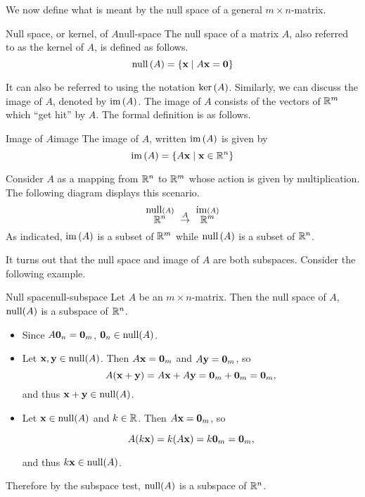 We now define what is meant by the null space of a general $m\times n$-matrix.

\begin{definition}{Null space, or kernel, of $A$}{null-space}
The null space of a matrix $A$, also referred to as the kernel of $A$, 
is defined as follows.%
\begin{equation*}
\mbox{\rm null} \left(A\right) =\left\{\mbox{\bf x} \mid A \mbox{\bf x} =\mbox{\bf 0}\right\}
\end{equation*}
\end{definition}

It can also be referred to using the notation $\ker \left(
A\right)$. 
Similarly, we can discuss the image of $A$, denoted by
$\mbox{\rm im}\left(A\right)$. The image of $A$ consists of the vectors
of $\mathbb{R}^{m}$ which ``get hit'' by $A$.  The formal definition
is as follows.

\begin{definition}{Image of $A$}{image}
The image of $A$, written $\mbox{\rm im}\left(A\right)$ is given by
\[
\mbox{\rm im}\left(A \right) = \left\{A\mbox{\bf x} \mid \mbox{\bf x} \in \mathbb{R}^n \right\}
\]
\end{definition}

Consider
$A$ as a mapping from $\mathbb{R}^{n}$ to $\mathbb{R}^{m}$ whose action is given by multiplication. The following diagram displays this scenario. 
\begin{equation*}
\overset{\func{null} \tup{A} }{\R^{n}}\ \overset{A}{\rightarrow }\ 
\overset{
\func{im}\tup{A} }{\R^{m}}
\end{equation*}
As indicated, $\mbox{\rm im}\left(A\right) $ is a subset of $\mathbb{R}^{m}$
while $\mbox{\rm null} \left(A\right) $ is a subset of $\mathbb{R}^{n}$.

It turns out that the null space and image of $A$ are both subspaces. Consider the following example.

\begin{example}{Null space}{null-subspace}
Let $A$ be an $m\times n$-matrix. Then the null space of $A$, $\mbox{\rm null}(A)$ is 
a subspace of $\mathbb{R}^n$.
\end{example}

\begin{solution}
\begin{itemize}
\item Since $A\mbox{\bf 0}_n=\mbox{\bf 0}_m$, 
$\mbox{\bf 0}_n\in\mbox{\rm null}(A)$.

\item Let $\mbox{\bf x},\mbox{\bf y}\in\mbox{\rm null}(A)$. 
Then $A\mbox{\bf x}=\mbox{\bf 0}_m$ and $A\mbox{\bf y}=\mbox{\bf 0}_m$, so
\[ A(\mbox{\bf x}+\mbox{\bf y})=A\mbox{\bf x}+A\mbox{\bf y} = \mbox{\bf 0}_m+\mbox{\bf 0}_m=\mbox{\bf 0}_m,\]
and thus $\mbox{\bf x}+\mbox{\bf y}\in\mbox{\rm null}(A)$.
\item Let $\mbox{\bf x}\in\mbox{\rm null}(A)$ and $k\in\mathbb{R}$.
Then $A\mbox{\bf x}=\mbox{\bf 0}_m$, so

\[ A(k\mbox{\bf x}) = k(A\mbox{\bf x})=k\mbox{\bf 0}_m=\mbox{\bf 0}_m,\]

and thus $k\mbox{\bf x}\in\mbox{\rm null}(A)$.
\end{itemize}
Therefore by the subspace test, $\mbox{\rm null}(A)$ is a subspace of $\mathbb{R}^n$.

\end{solution}

